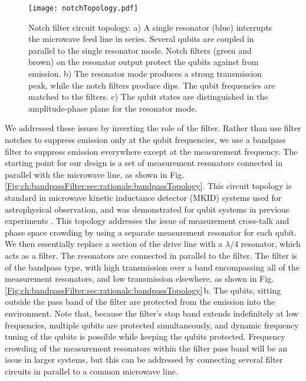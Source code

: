 \begin{figure}
\begin{centering}
\texttt{[image: notchTopology.pdf]}
\par\end{centering}
\caption{Notch filter circuit topology. a) A single resonator (blue) interrupts the microwave feed line in series. Several qubits are coupled in parallel to the single resonator mode. Notch filters (green and brown) on the resonator output protect the qubits against from emission. b) The resonator mode produces a strong transmission peak, while the notch filters produce dips. The qubit frequencies are matched to the filters. c) The qubit states are distinguished in the amplitude-phase plane for the resonator mode.}
\label{Fig:ch:bandpassFilter:sec:rationale:notchTopology}
\end{figure}

We addressed these issues by inverting the role of the filter.
Rather than use filter notches to suppress emission only at the qubit frequencies, we use a bandpass filter to suppress emission everywhere except at the measurement frequency.
The starting point for our design is a set of measurement resonators connected in parallel with the microwave line, as shown in Fig.\,\ref{Fig:ch:bandpassFilter:sec:rationale:bandpassTopology}.
This circuit topology is standard in microwave kinetic inductance detector (MKID) systems used for astrophysical observation, and was demonstrated for qubit systems in previous experiments \cite{Chen:readout2012, Barends:XMon2013}.
This topology addresses the issue of measurement cross-talk and phase space crowding by using a separate measurement resonator for each qubit.
We then essentially replace a section of the drive line with a $\lambda/4$ resonator, which acts as a filter.
The resonators are connected in parallel to the filter.
The filter is of the bandpass type, with high transmission over a band encompassing all of the measurement resonators, and low transmission elsewhere, as shown in Fig.\,\ref{Fig:ch:bandpassFilter:sec:rationale:bandpassTopology}\,b.
The qubits, sitting outside the pass band of the filter are protected from the emission into the environment.
Note that, because the filter's stop band extends indefinitely at low frequencies, multiple qubits are protected simultaneously, and dynamic frequency tuning of the qubits is possible while keeping the qubits protected.
Frequency crowding of the measurement resonators within the filter pass band will be an issue in larger systems, but this can be addressed by connecting several filter circuits in parallel to a common microwave line.

